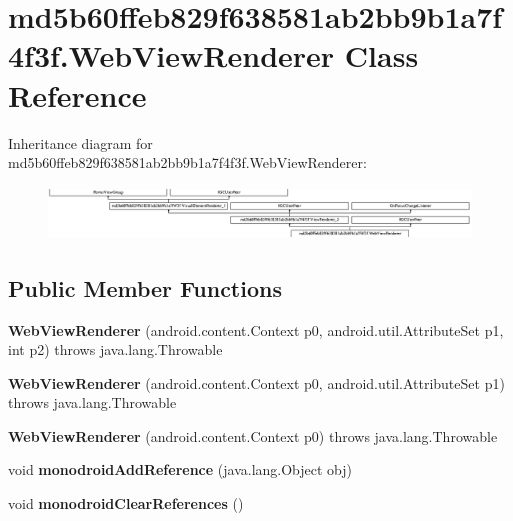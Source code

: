 \hypertarget{classmd5b60ffeb829f638581ab2bb9b1a7f4f3f_1_1WebViewRenderer}{}\section{md5b60ffeb829f638581ab2bb9b1a7f4f3f.\+Web\+View\+Renderer Class Reference}
\label{classmd5b60ffeb829f638581ab2bb9b1a7f4f3f_1_1WebViewRenderer}
Inheritance diagram for md5b60ffeb829f638581ab2bb9b1a7f4f3f.\+Web\+View\+Renderer\+:\begin{figure}[H]
\begin{center}
\leavevmode
\includegraphics[height=1.403509cm]{classmd5b60ffeb829f638581ab2bb9b1a7f4f3f_1_1WebViewRenderer}
\end{center}
\end{figure}
\subsection*{Public Member Functions}
\begin{DoxyCompactItemize}
\item 
\mbox{\label{classmd5b60ffeb829f638581ab2bb9b1a7f4f3f_1_1WebViewRenderer_aefd07d6eeb7a2a7eba83ec8f30ddf5a0}} 
{\bfseries Web\+View\+Renderer} (android.\+content.\+Context p0, android.\+util.\+Attribute\+Set p1, int p2)  throws java.\+lang.\+Throwable 	
\item 
\mbox{\label{classmd5b60ffeb829f638581ab2bb9b1a7f4f3f_1_1WebViewRenderer_a5d31cef44bb6ebaec7f75139c55577ac}} 
{\bfseries Web\+View\+Renderer} (android.\+content.\+Context p0, android.\+util.\+Attribute\+Set p1)  throws java.\+lang.\+Throwable 	
\item 
\mbox{\label{classmd5b60ffeb829f638581ab2bb9b1a7f4f3f_1_1WebViewRenderer_ad389d22a1a6485d39e52a0d587ca519b}} 
{\bfseries Web\+View\+Renderer} (android.\+content.\+Context p0)  throws java.\+lang.\+Throwable 	
\item 
\mbox{\label{classmd5b60ffeb829f638581ab2bb9b1a7f4f3f_1_1WebViewRenderer_a395da0b1470b8a8d7fe3d8f11678dd44}} 
void {\bfseries monodroid\+Add\+Reference} (java.\+lang.\+Object obj)
\item 
\mbox{\label{classmd5b60ffeb829f638581ab2bb9b1a7f4f3f_1_1WebViewRenderer_a554c17e18aeffc2dcd3b9899551fd449}} 
void {\bfseries monodroid\+Clear\+References} ()
\end{DoxyCompactItemize}
